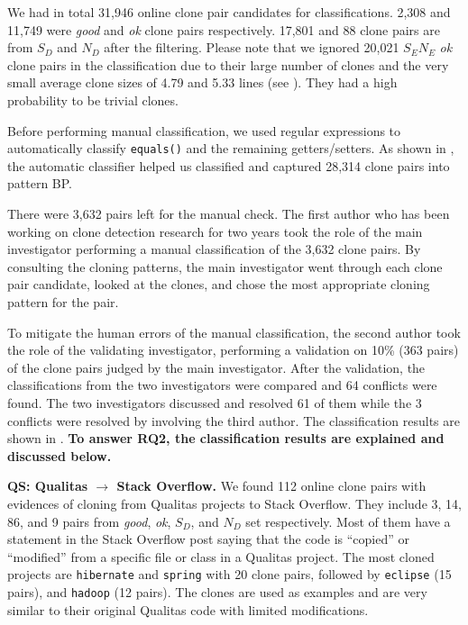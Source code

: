 \documentclass[sigconf,review, anonymous]{acmart}
\begin{document}
We had in total 31,946 online clone pair candidates for classifications. 2,308 and 11,749 were \textit{good} and \textit{ok} clone pairs respectively. 17,801 and 88 clone pairs are from $S_D$ and $N_D$ after the filtering. Please note that we ignored 20,021 $S_EN_E$ \textit{ok} clone pairs in the classification due to their large number of clones and the very small average clone sizes of 4.79 and 5.33 lines (see ). They had a high probability to be trivial clones. 

Before performing manual classification, we used regular expressions to automatically classify {\small\texttt{equals()}} and the remaining getters/setters. As shown in , the automatic classifier helped us classified and captured 28,314 clone pairs into pattern BP. 

There were 3,632 pairs left for the manual check. The first author who has been working on clone detection research for two years took the role of the main investigator performing a manual classification of the 3,632 clone pairs. By consulting the cloning patterns, the main investigator went through each clone pair candidate, looked at the clones, and chose the most appropriate cloning pattern for the pair. %

To mitigate the human errors of the manual classification, the second author took the role of the validating investigator, performing a validation on 10\% (363 pairs) of the clone pairs judged by the main investigator. After the validation, the classifications from the two investigators were compared and 64 conflicts were found. The two investigators discussed and resolved 61 of them while the 3 conflicts were resolved by involving the third author. The classification results are shown in . %
\textbf{To answer RQ2, the classification results are explained and discussed below.}

\textbf{QS: Qualitas $\rightarrow$ Stack Overflow.} We found 112 online clone pairs with evidences of cloning from Qualitas projects to Stack Overflow. They include 3, 14, 86, and 9 pairs from \textit{good}, \textit{ok}, $S_D$, and $N_D$ set respectively. Most of them have a statement in the Stack Overflow post saying that the code is ``copied'' or ``modified'' from a specific file or class in a Qualitas project. The most cloned projects are {\small\texttt{hibernate}} and {\small\texttt{spring}} with 20 clone pairs, followed by {\small\texttt{eclipse}} (15 pairs), and {\small\texttt{hadoop}} (12 pairs). The clones are used as examples and are very similar to their original Qualitas code with limited modifications.
\end{document}
